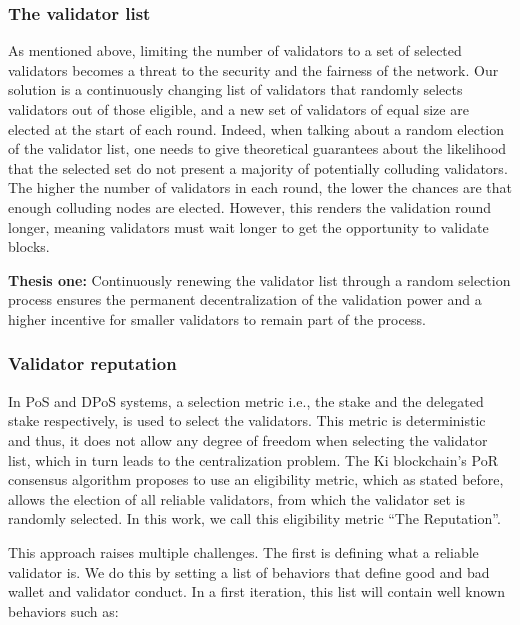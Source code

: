 \subsubsection{The validator list}
\label{sec:kiblockchainvalidatorlist}
As mentioned above, limiting the number of validators to a set of selected validators becomes a threat to the security and the fairness of the network. Our solution is a continuously changing list of validators that randomly selects validators out of those eligible, and a new set of validators of equal size are elected at the start of each round. Indeed, when talking about a random election of the validator list, one needs to give theoretical guarantees about the likelihood that the selected set do not present a majority of potentially colluding validators. The higher the number of validators in each round, the lower the chances are that enough colluding nodes are elected. However, this renders the validation round longer, meaning validators must wait longer to get the opportunity to validate blocks.

\textbf{Thesis one:} Continuously renewing the validator list through a random selection process ensures the permanent decentralization of the validation power and a higher incentive for smaller validators to remain part of the process.

\subsubsection{Validator reputation}
\label{sec:kiblockchainvalidatorrep}
In PoS and DPoS systems, a selection metric i.e., the stake and the delegated stake respectively, is used to select the validators. This metric is deterministic and thus, it does not allow any degree of freedom when selecting the validator list, which in turn leads to the centralization problem. The Ki blockchain's PoR consensus algorithm proposes to use an eligibility metric, which as stated before, allows the election of all reliable validators, from which the validator set is randomly selected. In this work, we call this eligibility metric “The Reputation”.

This approach raises multiple challenges. The first is defining what a reliable validator is. We do this by setting a  list of behaviors that define good and bad wallet and validator conduct. In a first iteration, this list will contain well known behaviors such as:

